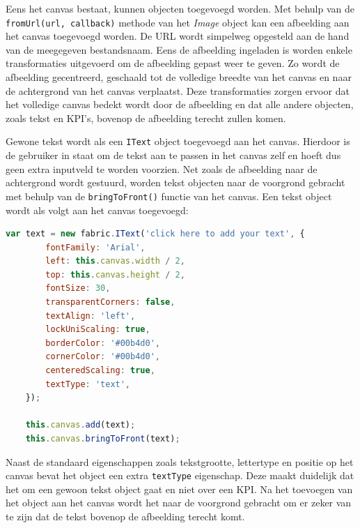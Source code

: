 Eens het canvas bestaat, kunnen objecten toegevoegd worden. Met behulp van de \texttt{fromUrl(url, callback)} methode van het \textit{Image} object kan een afbeelding aan het canvas toegevoegd worden. De URL wordt simpelweg opgesteld aan de hand van de meegegeven bestandsnaam. Eens de afbeelding ingeladen is worden enkele transformaties uitgevoerd om de afbeelding gepast weer te geven. Zo wordt de afbeelding gecentreerd, geschaald tot de volledige breedte van het canvas en naar de achtergrond van het canvas verplaatst. Deze transformaties zorgen ervoor dat het volledige canvas bedekt wordt door de afbeelding en dat alle andere objecten, zoals tekst en KPI's, bovenop de afbeelding terecht zullen komen. 


Gewone tekst wordt als een \texttt{IText} object toegevoegd aan het canvas. Hierdoor is de gebruiker in staat om de tekst aan te passen in het canvas zelf en hoeft dus geen extra inputveld te worden voorzien. Net zoals de afbeelding naar de achtergrond wordt gestuurd, worden tekst objecten naar de voorgrond gebracht met behulp van de \texttt{bringToFront()} functie van het canvas. Een tekst object wordt als volgt aan het canvas toegevoegd:

\begin{lstlisting}[caption={ThemeAnnotations component - tekst toevoegen aan het canvas}, label={ThemeAnnotationsCanvasText},language=javascript]
	var text = new fabric.IText('click here to add your text', {
		fontFamily: 'Arial',
		left: this.canvas.width / 2,
		top: this.canvas.height / 2,
		fontSize: 30,
		transparentCorners: false,
		textAlign: 'left',
		lockUniScaling: true,
		borderColor: '#00b4d0',
		cornerColor: '#00b4d0',
		centeredScaling: true,
		textType: 'text',
	});
	
	this.canvas.add(text);
	this.canvas.bringToFront(text);
\end{lstlisting}

Naast de standaard eigenschappen zoals tekstgrootte, lettertype en positie op het canvas bevat het object een extra \texttt{textType} eigenschap. Deze maakt duidelijk dat het om een gewoon tekst object gaat en niet over een KPI. Na het toevoegen van het object aan het canvas wordt het naar de voorgrond gebracht om er zeker van te zijn dat de tekst bovenop de afbeelding terecht komt. 

